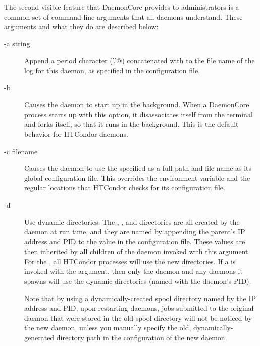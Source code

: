 The second visible feature that DaemonCore provides to administrators
is a common set of command-line arguments that all daemons understand.
These arguments and what they do are described below:

\begin{description}

\item[-a string] Append a period character (\verb@'.'@) concatenated with
   to the file name of the log for this daemon,
  as specified in the configuration file.

\item[-b] Causes the daemon to start up in the background.  When a
  DaemonCore process starts up with this option, it disassociates itself
  from the terminal and forks itself, so that it runs in the
  background.  This is the default behavior for HTCondor daemons.

\item[-c filename] Causes the daemon to use the specified 
  as a full path and file name as its global configuration file.  This
  overrides the  environment variable and the
  regular locations that HTCondor checks for its configuration file.

\item[-d] Use dynamic directories.
 The , , and  directories
 are all created by the daemon at run time,
 and they are named by appending the
 parent's IP address and PID to the value in the 
 configuration file.
 These values are then inherited by all children of the daemon
 invoked with this  argument.
 For the ,
 all HTCondor processes will use the new directories.
 If a  is invoked with the  argument,
 then only the  daemon and any
  daemons it spawns will use the dynamic
 directories (named with the  daemon's PID).

 Note that by using a dynamically-created spool directory
 named by the IP address and PID,
 upon restarting daemons,
 jobs submitted to the original  daemon
 that were stored in the old spool directory will not be noticed
 by the new  daemon,
 unless you manually specify the old, dynamically-generated 
  directory path in the configuration of the
 new  daemon.


\end{description}

